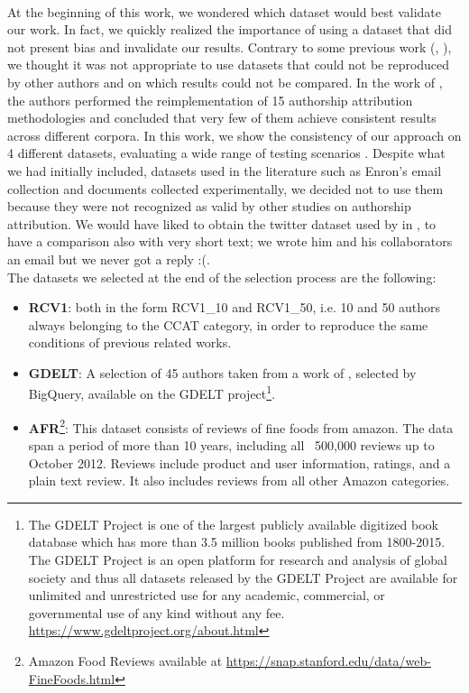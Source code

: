 \paragraph{}
At the beginning of this work, we wondered which dataset would best validate our work. In fact, we quickly realized the importance of using a dataset that did not present bias and invalidate our results. Contrary to some previous work (\cite{diederich2003authorship}, \cite{koppel2003exploiting}), we thought it was not appropriate to use datasets that could not be reproduced by other authors and on which results could not be compared.
In the work of \citeauthor{potthast2016wrote} \cite{potthast2016wrote},
the authors performed the reimplementation of 15 authorship attribution methodologies and concluded that very few of them achieve consistent results across different corpora. In
this work, we show the consistency of our approach on 4 different datasets, evaluating a wide range of testing scenarios \cite{posadas2017application}.
Despite what we had initially included, datasets used in the literature such as Enron's email collection and documents collected experimentally, we decided not to use them because they were not recognized as valid by other studies on authorship attribution.
We would have liked to obtain the twitter dataset used by \citeauthor{layton2010authorship} in \cite{layton2010authorship}, to have a comparison also with very short text; we wrote him and his collaborators an email but we never got a reply :(.\\
The datasets we selected at the end of the selection process are the following:
\begin{itemize}
\item \textbf{RCV1}: both in the form RCV1\_10 and RCV1\_50, i.e. 10 and 50 authors always belonging to the CCAT category, in order to reproduce the same conditions of previous related works.
\item \textbf{GDELT}: A selection of 45 authors taken from a work of \cite{gungor2018benchmarking}, selected by BigQuery, available on the GDELT project\footnote{The GDELT Project is one of the largest publicly available digitized book database which
	has more than 3.5 million books published from 1800-2015. The GDELT Project is an
	open platform for research and analysis of global society and thus all datasets released by
	the GDELT Project are available for unlimited and unrestricted use for any academic,
	commercial, or governmental use of any kind without any fee. \url{https://www.gdeltproject.org/about.html}}.
\item \textbf{AFR}\footnote{Amazon Food Reviews available at \url{https://snap.stanford.edu/data/web-FineFoods.html}}: This dataset consists of reviews of fine foods from amazon. The data span a period of more than 10 years, including all ~500,000 reviews up to October 2012. Reviews include product and user information, ratings, and a plain text review. It also includes reviews from all other Amazon categories.
\end{itemize}
